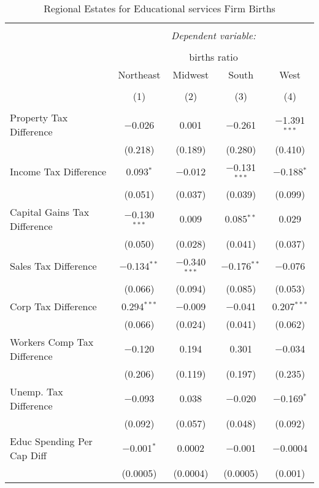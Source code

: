 
\begin{table}[!htbp] \centering 
  \caption{Regional Estates for  Educational services Firm Births} 
  \label{} 
\begin{tabular}{@{\extracolsep{5pt}}lcccc} 
\\[-1.8ex]\hline 
\hline \\[-1.8ex] 
 & \multicolumn{4}{c}{\textit{Dependent variable:}} \\ 
\cline{2-5} 
\\[-1.8ex] & \multicolumn{4}{c}{births ratio} \\ 
 & Northeast & Midwest & South & West \\ 
\\[-1.8ex] & (1) & (2) & (3) & (4)\\ 
\hline \\[-1.8ex] 
 Property Tax Difference & $-$0.026 & 0.001 & $-$0.261 & $-$1.391$^{***}$ \\ 
  & (0.218) & (0.189) & (0.280) & (0.410) \\ 
  Income Tax Difference & 0.093$^{*}$ & $-$0.012 & $-$0.131$^{***}$ & $-$0.188$^{*}$ \\ 
  & (0.051) & (0.037) & (0.039) & (0.099) \\ 
  Capital Gains Tax Difference & $-$0.130$^{***}$ & 0.009 & 0.085$^{**}$ & 0.029 \\ 
  & (0.050) & (0.028) & (0.041) & (0.037) \\ 
  Sales Tax Difference & $-$0.134$^{**}$ & $-$0.340$^{***}$ & $-$0.176$^{**}$ & $-$0.076 \\ 
  & (0.066) & (0.094) & (0.085) & (0.053) \\ 
  Corp Tax Difference & 0.294$^{***}$ & $-$0.009 & $-$0.041 & 0.207$^{***}$ \\ 
  & (0.066) & (0.024) & (0.041) & (0.062) \\ 
  Workers Comp Tax Difference & $-$0.120 & 0.194 & 0.301 & $-$0.034 \\ 
  & (0.206) & (0.119) & (0.197) & (0.235) \\ 
  Unemp. Tax Difference & $-$0.093 & 0.038 & $-$0.020 & $-$0.169$^{*}$ \\ 
  & (0.092) & (0.057) & (0.048) & (0.092) \\ 
  Educ Spending Per Cap Diff & $-$0.001$^{*}$ & 0.0002 & $-$0.001 & $-$0.0004 \\ 
  & (0.0005) & (0.0004) & (0.0005) & (0.001) \\ 

\end{tabular}
\end{table}
